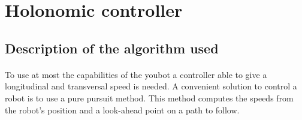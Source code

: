\documentclass[12pt,a4paper]{article}
\begin{document}

\tableofcontents

\newpage


\section{Holonomic controller}
\subsection{Description of the algorithm used }
\paragraph{} To use at most the capabilities of the youbot a controller able to give a longitudinal and transversal speed is needed. A convenient solution to control a robot is to use a pure pursuit method. This method computes the speeds from the robot's position and a look-ahead point on a path to follow.
\end{document}
